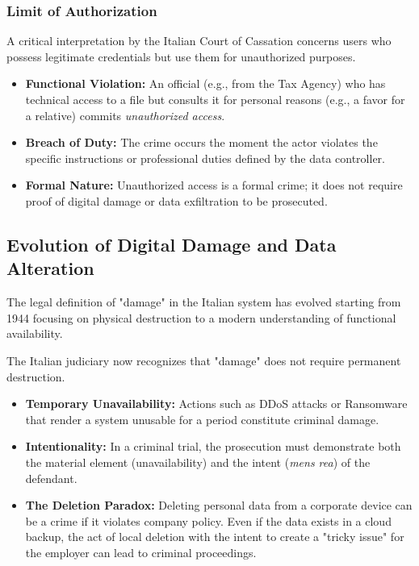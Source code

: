 \subsubsection*{Limit of Authorization}
A critical interpretation by the Italian Court of Cassation concerns users who possess legitimate credentials but use them for unauthorized purposes.
\begin{itemize}
    \item \textbf{Functional Violation:} An official (e.g., from the Tax Agency) who has technical access to a file but consults it for personal reasons (e.g., a favor for a relative) commits \textit{unauthorized access}.
    \item \textbf{Breach of Duty:} The crime occurs the moment the actor violates the specific instructions or professional duties defined by the data controller.
    \item \textbf{Formal Nature:} Unauthorized access is a formal crime; it does not require proof of digital damage or data exfiltration to be prosecuted.
\end{itemize}

\subsection{Evolution of Digital Damage and Data Alteration}
The legal definition of "damage" in the Italian system has evolved starting from 1944 focusing on physical destruction to a modern understanding of functional availability.
\medskip

\noindent
The Italian judiciary now recognizes that "damage" does not require permanent destruction.
\begin{itemize}
    \item \textbf{Temporary Unavailability:} Actions such as DDoS attacks or Ransomware that render a system unusable for a period constitute criminal damage.
    \item \textbf{Intentionality:} In a criminal trial, the prosecution must demonstrate both the material element (unavailability) and the intent (\textit{mens rea}) of the defendant.
    \item \textbf{The Deletion Paradox:} Deleting personal data from a corporate device can be a crime if it violates company policy. Even if the data exists in a cloud backup, the act of local deletion with the intent to create a "tricky issue" for the employer can lead to criminal proceedings.
\end{itemize}

